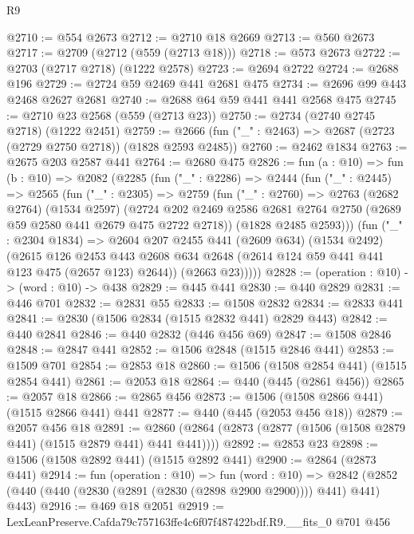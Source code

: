 \begin{lexlean}{R9}
\begin{coremodule}
@2710 := @554 @2673
@2712 := @2710 @18 @2669
@2713 := @560 @2673
@2717 := @2709 (@2712 (@559 (@2713 @18)))
@2718 := @573 @2673
@2722 := @2703 (@2717 @2718) (@1222 @2578)
@2723 := @2694 @2722
@2724 := @2688 @196
@2729 := @2724 @59 @2469 @441 @2681 @475
@2734 := @2696 @99 @443 @2468 @2627 @2681
@2740 := @2688 @64 @59 @441 @441 @2568 @475
@2745 := @2710 @23 @2568 (@559 (@2713 @23))
@2750 := @2734 (@2740 @2745 @2718) (@1222 @2451)
@2759 := @2666 (fun ("_" : @2463) => @2687 (@2723 (@2729 @2750 @2718)) (@1828 @2593 @2485))
@2760 := @2462 @1834
@2763 := @2675 @203 @2587 @441
@2764 := @2680 @475
@2826 := fun (a : @10) =>
  fun (b : @10) =>
  @2082
    (@2285
      (fun ("_" : @2286) =>
      @2444
        (fun ("_" : @2445) =>
        @2565
          (fun ("_" : @2305) =>
          @2759
            (fun ("_" : @2760) =>
            @2763
              (@2682 @2764)
              (@1534 @2597)
              (@2724
                @202
                @2469
                @2586
                @2681
                @2764
                @2750
                (@2689 @59 @2580 @441 @2679 @475 @2722 @2718))
              (@1828 @2485 @2593)))
          (fun ("_" : @2304 @1834) =>
          @2604
            @207
            @2455
            @441
            (@2609 @634)
            (@1534 @2492)
            (@2615
              @126
              @2453
              @443
              @2608
              @634
              @2648
              (@2614 @124 @59 @441 @441 @123 @475 (@2657 @123) @2644))
            (@2663 @23)))))
@2828 := (operation : @10) -> (word : @10) -> @438
@2829 := @445 @441
@2830 := @440 @2829
@2831 := @446 @701
@2832 := @2831 @55
@2833 := @1508 @2832
@2834 := @2833 @441
@2841 := @2830 (@1506 @2834 (@1515 @2832 @441) @2829 @443)
@2842 := @440 @2841
@2846 := @440 @2832 (@446 @456 @69)
@2847 := @1508 @2846
@2848 := @2847 @441
@2852 := @1506 @2848 (@1515 @2846 @441)
@2853 := @1509 @701
@2854 := @2853 @18
@2860 := @1506 (@1508 @2854 @441) (@1515 @2854 @441)
@2861 := @2053 @18
@2864 := @440 (@445 (@2861 @456))
@2865 := @2057 @18
@2866 := @2865 @456
@2873 := @1506 (@1508 @2866 @441) (@1515 @2866 @441) @441
@2877 := @440 (@445 (@2053 @456 @18))
@2879 := @2057 @456 @18
@2891 := @2860 (@2864 (@2873 (@2877 (@1506 (@1508 @2879 @441) (@1515 @2879 @441) @441 @441))))
@2892 := @2853 @23
@2898 := @1506 (@1508 @2892 @441) (@1515 @2892 @441)
@2900 := @2864 (@2873 @441)
@2914 := fun (operation : @10) =>
  fun (word : @10) =>
  @2842 (@2852 (@440 (@440 (@2830 (@2891 (@2830 (@2898 @2900 @2900)))) @441) @441) @443)
@2916 := @469 @18 @2051
@2919 := LexLeanPreserve.Cafda79c757163ffe4c6f07f487422bdf.R9.__fits_0 @701 @456

\end{coremodule}
\end{lexlean}
